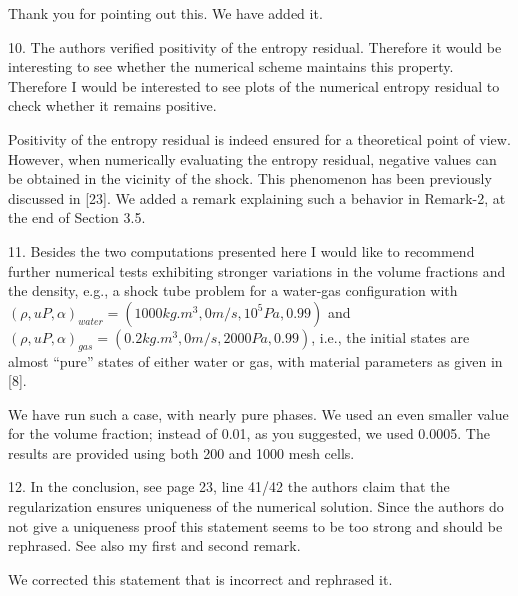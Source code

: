 \documentclass{article}
\newcommand{\tcr}[1]{\textcolor{red}{#1}}
\begin{document}
Thank you for pointing out this. We have added it.
\bigskip


{\color{blue}
10. The authors verified positivity of the entropy residual. Therefore it would be 
interesting to see whether the numerical scheme maintains this property. Therefore I
would be interested to see plots of the numerical entropy residual to check whether
it remains positive.}

Positivity of the entropy residual is indeed ensured for a theoretical point of view. 
However, when numerically evaluating the entropy residual, negative values can be obtained in 
the vicinity of the shock. This phenomenon has been previously discussed in [23]. 
We added a remark explaining such a behavior in Remark-2, at the end of Section 3.5.

\bigskip


{\color{blue}
11. Besides the two computations presented here I would like to recommend further
numerical tests exhibiting stronger variations in the volume fractions and the density, 
e.g., a shock tube problem for a water-gas configuration with 
$(\rho, u P, \alpha)_{water} = (1000kg.m^3, 0m/s, 10^5Pa, 0.99)$ and 
$(\rho, u P, \alpha)_{gas}   = (0.2 kg.m^3, 0m/s, 2000Pa, 0.99)$,
i.e., the initial states are almost ``pure'' states of either water or gas, with material
parameters as given in [8].}

We have run such a case, with nearly pure phases. We used an even smaller value for the volume fraction; instead of 0.01, as you suggested, we used 0.0005. 
The results are provided using both 200 and 1000 mesh cells.
\bigskip


{\color{blue}
12. In the conclusion, see page 23, line 41/42 the authors claim that the regularization
ensures uniqueness of the numerical solution. Since the authors do not give a 
uniqueness proof this statement seems to be too strong and should be rephrased. See also
my first and second remark.}

We corrected this statement that is incorrect and rephrased it.

\bigskip



\end{document}
